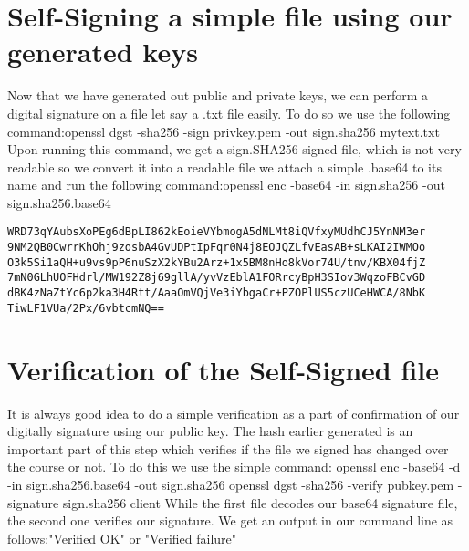 \documentclass[11pt]{article}
\begin{document}
\section{Self-Signing a simple file using our generated keys}
Now that we have generated out public and private keys, we can perform a digital signature on a file let say a .txt file easily. To do so we use the following command:\newline \newline openssl dgst -sha256 -sign privkey.pem -out sign.sha256 mytext.txt \newline \newline Upon running this command, we get a sign.SHA256 signed file, which is not very readable so we convert it into a readable file we attach a simple .base64 to its name and run the following command:\newline \newline openssl enc -base64 -in sign.sha256 -out sign.sha256.base64 \newline \newline

\begin{verbatim}
WRD73qYAubsXoPEg6dBpLI862kEoieVYbmogA5dNLMt8iQVfxyMUdhCJ5YnNM3er
9NM2QB0CwrrKhOhj9zosbA4GvUDPtIpFqr0N4j8EOJQZLfvEasAB+sLKAI2IWMOo
O3k5Si1aQH+u9vs9pP6nuSzX2kYBu2Arz+1x5BM8nHo8kVor74U/tnv/KBX04fjZ
7mN0GLhUOFHdrl/MW192Z8j69gllA/yvVzEblA1FORrcyBpH3SIov3WqzoFBCvGD
dBK4zNaZtYc6p2ka3H4Rtt/AaaOmVQjVe3iYbgaCr+PZOPlUS5czUCeHWCA/8NbK
TiwLF1VUa/2Px/6vbtcmNQ==
\end{verbatim}

\section{Verification of the Self-Signed file}
It is always good idea to do a simple verification as a part of confirmation of our digitally signature using our public key. The hash earlier generated is an important part of this step which verifies if the file we signed has changed over the course or not. To do this we use the simple command: \newline \newline openssl enc -base64 -d -in sign.sha256.base64 -out sign.sha256 \newline \newline openssl dgst -sha256 -verify pubkey.pem -signature sign.sha256 client \newline \newline While the first file decodes our base64 signature file, the second one verifies our signature. We get an output in our command line as follows:\newline \newline "Verified OK" or "Verified failure"
\end{document}
